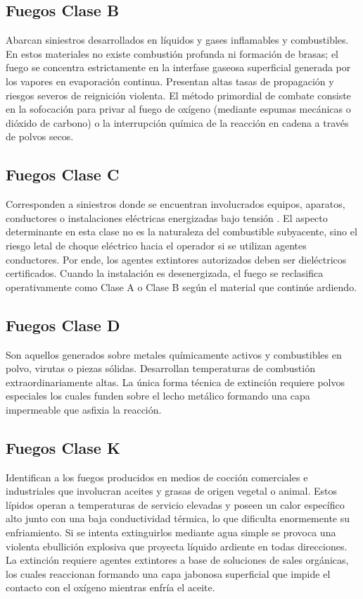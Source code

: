 \subsection{Fuegos Clase B}
Abarcan siniestros desarrollados en líquidos y gases inflamables y combustibles. En estos materiales no existe
combustión profunda ni formación de brasas; el fuego se concentra estrictamente en la interfase gaseosa superficial
generada por los vapores en evaporación continua. Presentan altas tasas de propagación y riesgos severos de reignición
violenta. El método primordial de combate consiste en la sofocación para privar al fuego de oxígeno (mediante espumas
mecánicas o dióxido de carbono) o la interrupción química de la reacción en cadena a través de polvos secos.

\subsection{Fuegos Clase C}
Corresponden a siniestros donde se encuentran involucrados equipos, aparatos, conductores o instalaciones eléctricas
energizadas bajo tensión . El aspecto determinante en esta clase no es la naturaleza del combustible subyacente, sino el
riesgo letal de choque eléctrico hacia el operador si se utilizan agentes conductores. Por ende, los agentes extintores
autorizados deben ser dieléctricos certificados. Cuando la instalación es desenergizada, el fuego se reclasifica
operativamente como Clase A o Clase B según el material que continúe ardiendo.

\subsection{Fuegos Clase D}
Son aquellos generados sobre metales químicamente activos y combustibles en polvo, virutas o piezas sólidas. Desarrollan
temperaturas de combustión extraordinariamente altas. La única forma técnica de extinción requiere polvos especiales los
cuales funden sobre el lecho metálico formando una capa impermeable que asfixia la reacción.

\subsection{Fuegos Clase K}
Identifican a los fuegos producidos en medios de cocción comerciales e industriales que involucran aceites y grasas de
origen vegetal o animal. Estos lípidos operan a temperaturas de servicio elevadas y poseen un calor específico alto
junto con una baja conductividad térmica, lo que dificulta enormemente su enfriamiento. Si se intenta extinguirlos
mediante agua simple se provoca una violenta ebullición explosiva que proyecta líquido ardiente en todas direcciones. La
extinción requiere agentes extintores a base de soluciones de sales orgánicas, los cuales reaccionan formando una capa
jabonosa superficial que impide el contacto con el oxígeno mientras enfría el aceite.

